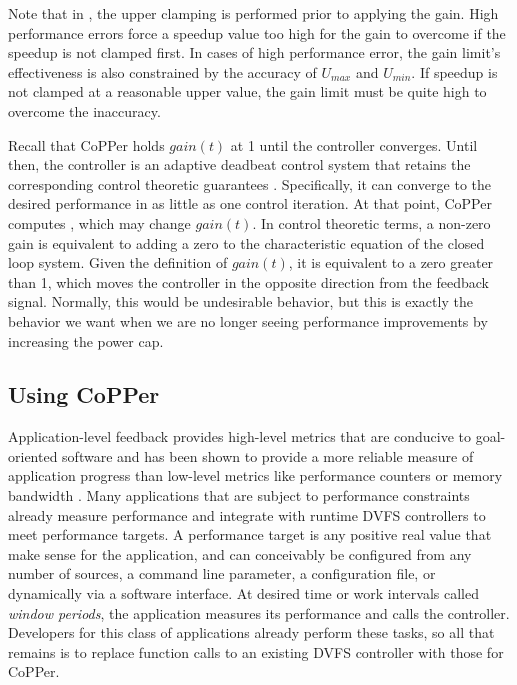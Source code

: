 Note that in , the upper clamping is performed prior to applying the gain.
High performance errors force a speedup value too high for the gain to overcome if the speedup is not clamped first.
In cases of high performance error, the gain limit's effectiveness is also constrained by the accuracy of $U_{max}$ and $U_{min}$.
If speedup is not clamped at a reasonable upper value, the gain limit must be quite high to overcome the inaccuracy.

Recall that CoPPer holds $gain(t)$ at 1 until the controller converges.
Until then, the controller is an adaptive deadbeat control system that retains the corresponding control theoretic guarantees \cite{ICSE2014}.
Specifically, it can converge to the desired performance in as little as one control iteration.
At that point, CoPPer computes , which may change $gain(t)$.
In control theoretic terms, a non-zero gain is equivalent to adding a zero to the characteristic equation of the closed loop system.
Given the definition of $gain(t)$, it is equivalent to a zero greater than 1, which moves the controller in the opposite direction from the feedback signal.
Normally, this would be undesirable behavior, but this is exactly the behavior we want when we are no longer seeing performance improvements by increasing the power cap.


\subsection{Using CoPPer}
\label{sec:copper-implementation}

Application-level feedback provides high-level metrics that are conducive to goal-oriented software and has been shown to provide a more reliable measure of application progress than low-level metrics like performance counters or memory bandwidth \cite{PTRADE}.
Many applications that are subject to performance constraints already measure performance and integrate with runtime DVFS controllers to meet performance targets.
A performance target is any positive real value that make sense for the application, and can conceivably be configured from any number of sources, \eg a command line parameter, a configuration file, or dynamically via a software interface.
At desired time or work intervals called \emph{window periods}, the application measures its performance and calls the controller.
Developers for this class of applications already perform these tasks, so all that remains is to replace function calls to an existing DVFS controller with those for CoPPer.

